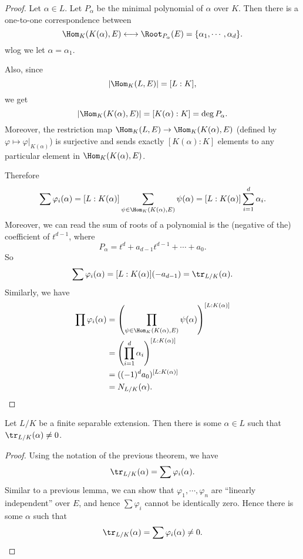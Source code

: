 \documentclass[a4paper]{article}
\begin{document}
\begin{proof}
  Let $\alpha \in L$. Let $P_\alpha$ be the minimal polynomial of $\alpha$ over $K$. Then there is a one-to-one correspondence between
  \[
    \Hom_K(K(\alpha), E)\longleftrightarrow \Root_{P_\alpha}(E) = \{\alpha_1, \cdots, \alpha_d\}.
  \]
  wlog we let $\alpha = \alpha_1$.

  Also, since
  \[
    |\Hom_K(L, E)| = [L:K],
  \]
  we get
  \[
    |\Hom_K(K(\alpha), E)| = [K(\alpha): K] = \deg P_\alpha.
  \]
  Moreover, the restriction map $\Hom_K(L, E) \to \Hom_K(K(\alpha), E)$ (defined by $\varphi \mapsto \varphi|_{K(\alpha)}$) is surjective and sends exactly $[K(\alpha): K]$ elements to any particular element in $\Hom_K(K(\alpha), E)$.

  Therefore
  \[
    \sum \varphi_i(\alpha) = [L:K(\alpha)] \sum_{\psi \in \Hom_K(K(\alpha), E)} \psi(\alpha) = [L:K(\alpha)] \sum_{i = 1}^d \alpha_i.
  \]
  Moreover, we can read the sum of roots of a polynomial is the (negative of the) coefficient of $t^{d - 1}$, where
  \[
    P_\alpha = t^d + a_{d - 1} t^{d - 1} + \cdots + a_0.
  \]
  So
  \[
    \sum \varphi_i(\alpha) = [L:K(\alpha)] (- a_{d - 1}) = \tr_{L/K}(\alpha).
  \]
  Similarly, we have
  \begin{align*}
    \prod \varphi_i(\alpha) &= \left(\prod_{\psi \in \Hom_K(K(\alpha), E)} \psi(\alpha)\right)^{[L:K(\alpha)]} \\
    &= \left(\prod_{i = 1}^d \alpha_i\right)^{[L:K(\alpha)]}\\
    &= ((- 1)^d a_0)^{[L:K(\alpha)]}\\
    &= N_{L/K}(\alpha).
  \end{align*}
\end{proof}

\begin{cor}
  Let $L/K$ be a finite separable extension. Then there is some $\alpha \in L$ such that $\tr_{L/K}(\alpha) \not= 0$.
\end{cor}

\begin{proof}
  Using the notation of the previous theorem, we have
  \[
    \tr_{L/K}(\alpha) = \sum \varphi_i (\alpha).
  \]
  Similar to a previous lemma, we can show that $\varphi_1, \cdots, \varphi_n$ are ``linearly independent'' over $E$, and hence $\sum \varphi_i$ cannot be identically zero. Hence there is some $\alpha$ such that
  \[
    \tr_{L/K}(\alpha) = \sum \varphi_i(\alpha) \not= 0.
  \]
\end{proof}
\end{document}
